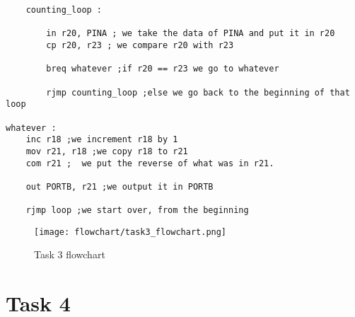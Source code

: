 \documentclass[a4paper,12pt]{article}
\begin{document}
\begin{lstlisting}
	counting_loop :

		in r20, PINA ; we take the data of PINA and put it in r20
		cp r20, r23 ; we compare r20 with r23

		breq whatever ;if r20 == r23 we go to whatever

		rjmp counting_loop ;else we go back to the beginning of that loop

whatever :
	inc r18 ;we increment r18 by 1
	mov r21, r18 ;we copy r18 to r21
	com r21 ;  we put the reverse of what was in r21.

	out PORTB, r21 ;we output it in PORTB

	rjmp loop ;we start over, from the beginning
\end{lstlisting}

\begin{figure}
\begin{center}
\texttt{[image: flowchart/task3\_flowchart.png]}
\end{center}
\caption{Task 3 flowchart}
\label{task3}
\end{figure}

\break

\section{Task 4}

\lstset{style=Asm}
\end{document}
